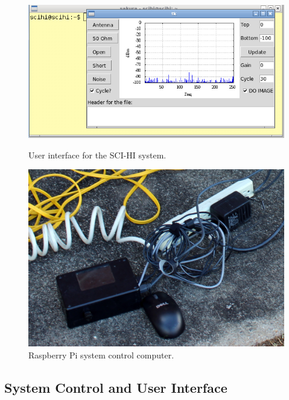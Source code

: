 \begin{figure}[htb]
\centering
\begin{minipage}[b]{0.48\textwidth}
\centering
\includegraphics[width=0.95\linewidth]{SCIHI_system/figures/SCIHI_UI_Screen.jpg}
\caption{User interface for the SCI-HI system. }
\label{Fig:GUI}
\end{minipage}%
\begin{minipage}[b]{0.02\textwidth}
\hspace{1cm}
\end{minipage}%
\begin{minipage}[b]{0.48\textwidth}
\centering
\includegraphics[width=0.95\linewidth]{SCIHI_system/figures/SCIHI_raspberry_pi.jpg}
\caption{Raspberry Pi system control computer.}
\label{Fig:raspberry_pi}

\end{minipage}
\end{figure}


\subsection{System Control and User Interface}

